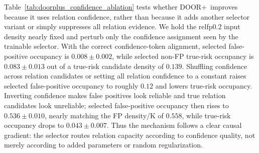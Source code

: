 \documentclass[10pt,journal,compsoc]{IEEEtran}
\newcommand{\doorplus}{\textsc{DOOR+}}
\begin{document}
Table~\ref{tab:doorplus_confidence_ablation} tests whether \doorplus\ improves because it uses relation confidence, rather than because it adds another selector variant or simply suppresses all relation evidence. We hold the relfp0.2 input density nearly fixed and perturb only the confidence assignment seen by the trainable selector. With the correct confidence-token alignment, selected false-positive occupancy is $0.008 \pm 0.002$, while selected non-FP true-risk occupancy is $0.083 \pm 0.013$ out of a true-risk candidate density of $0.139$. Shuffling confidence across relation candidates or setting all relation confidence to a constant raises selected false-positive occupancy to roughly $0.12$ and lowers true-risk occupancy. Inverting confidence makes false positives look reliable and true relation candidates look unreliable; selected false-positive occupancy then rises to $0.536 \pm 0.010$, nearly matching the FP density/K of $0.558$, while true-risk occupancy drops to $0.043 \pm 0.007$. Thus the mechanism follows a clear causal gradient: the selector routes relation capacity according to confidence quality, not merely according to added parameters or random regularization.

\begin{table}[!t]
\caption{Confidence and true-risk retention ablation for trainable \doorplus\ on nuPlan 50k relfp0.2, horizon 20 (2k validation samples per seed). FP and true-risk candidate densities remain nearly fixed, but the selected relation-slot composition changes sharply with confidence quality.}
\label{tab:doorplus_confidence_ablation}
\centering
{}
\end{table}
\end{document}
